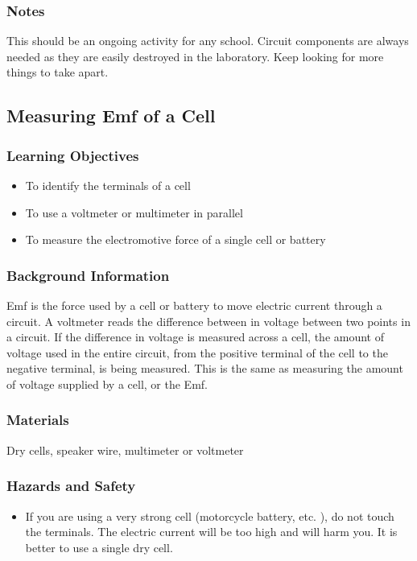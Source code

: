 \subsubsection*{Notes}
This should be an ongoing activity for any school. Circuit components are always needed as they are easily destroyed in the laboratory. Keep looking for more things to take apart.  

\subsection{Measuring Emf of a Cell}

\subsubsection*{Learning Objectives}
\begin{itemize}
\item{To identify the terminals of a cell} 
\item{To use a voltmeter or multimeter in parallel} 
\item{To measure the electromotive force of a single cell or battery} 
\end{itemize}

\subsubsection*{Background Information}
Emf is the force used by a cell or battery to move electric current through a circuit. A voltmeter reads the difference between in voltage between two points in a circuit. If the difference in voltage is measured across a cell, the amount of voltage used in the entire circuit, from the positive terminal of the cell to the negative terminal, is being measured. This is the same as measuring the amount of voltage supplied by a cell, or the Emf.  

\subsubsection*{Materials}
Dry cells, speaker wire, multimeter or voltmeter

\subsubsection*{Hazards and Safety}
\begin{itemize}
\item{If you are using a very strong cell (motorcycle battery, etc.  ), do not touch the terminals. The electric current will be too high and will harm you. It is better to use a single dry cell.} 
\end{itemize}


